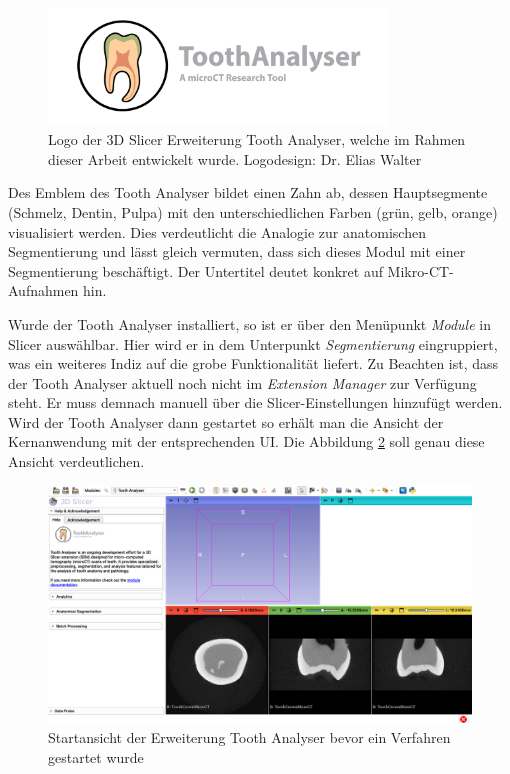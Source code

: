 \begin{figure}[h]
	\centering
	\includegraphics[width=0.8\textwidth]{img/SlicerToothAnalyser.png}
	\caption{Logo der 3D Slicer Erweiterung Tooth Analyser, welche im Rahmen dieser
	Arbeit entwickelt wurde. Logodesign: Dr. Elias Walter}
	\label{fig:logo_tooth_analyser}
\end{figure}

Des Emblem des Tooth Analyser bildet einen Zahn ab, dessen Hauptsegmente (Schmelz,
Dentin, Pulpa) mit den unterschiedlichen Farben (grün, gelb, orange)
visualisiert werden. Dies verdeutlicht die Analogie zur anatomischen Segmentierung
und lässt gleich vermuten, dass sich dieses Modul mit einer Segmentierung
beschäftigt. Der Untertitel deutet konkret auf Mikro-\ac{CT}-Aufnahmen hin.

Wurde der Tooth Analyser installiert, so ist er über den Menüpunkt \textit{Module}
in Slicer auswählbar. Hier wird er in dem Unterpunkt \textit{Segmentierung}
eingruppiert, was ein weiteres Indiz auf die grobe Funktionalität liefert. Zu
Beachten ist, dass der Tooth Analyser aktuell noch nicht im \textit{Extension
Manager} zur Verfügung steht. Er muss demnach manuell über die Slicer-Einstellungen
hinzufügt werden. Wird der Tooth Analyser dann gestartet so erhält man die
Ansicht der Kernanwendung mit der entsprechenden \ac{UI}. Die Abbildung
\ref{fig:tooth_analyser_start_up} soll genau diese Ansicht verdeutlichen.

\begin{figure}[h]
	\centering
	\includegraphics[width=\textwidth]{img/toothAnalyserStartup.png}
	\caption{Startansicht der Erweiterung Tooth Analyser bevor ein Verfahren
	gestartet wurde}
	\label{fig:tooth_analyser_start_up}
\end{figure}

